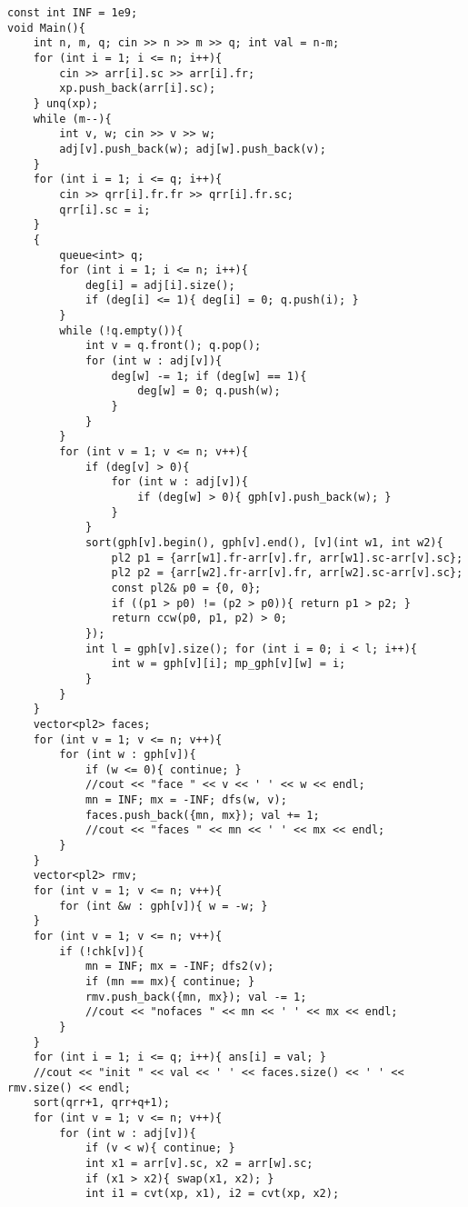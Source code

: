 \documentclass[landscape, 8pt, a4paper, oneside, twocolumn]{extarticle}
\begin{document}
\begin{verbatim}
const int INF = 1e9;
void Main(){
    int n, m, q; cin >> n >> m >> q; int val = n-m;
    for (int i = 1; i <= n; i++){
        cin >> arr[i].sc >> arr[i].fr;
        xp.push_back(arr[i].sc);
    } unq(xp);
    while (m--){
        int v, w; cin >> v >> w;
        adj[v].push_back(w); adj[w].push_back(v);
    }
    for (int i = 1; i <= q; i++){
        cin >> qrr[i].fr.fr >> qrr[i].fr.sc;
        qrr[i].sc = i;
    }
    {
        queue<int> q;
        for (int i = 1; i <= n; i++){
            deg[i] = adj[i].size();
            if (deg[i] <= 1){ deg[i] = 0; q.push(i); }
        }
        while (!q.empty()){
            int v = q.front(); q.pop();
            for (int w : adj[v]){
                deg[w] -= 1; if (deg[w] == 1){
                    deg[w] = 0; q.push(w);
                }
            }
        }
        for (int v = 1; v <= n; v++){
            if (deg[v] > 0){
                for (int w : adj[v]){
                    if (deg[w] > 0){ gph[v].push_back(w); }
                }
            }
            sort(gph[v].begin(), gph[v].end(), [v](int w1, int w2){
                pl2 p1 = {arr[w1].fr-arr[v].fr, arr[w1].sc-arr[v].sc};
                pl2 p2 = {arr[w2].fr-arr[v].fr, arr[w2].sc-arr[v].sc};
                const pl2& p0 = {0, 0};
                if ((p1 > p0) != (p2 > p0)){ return p1 > p2; }
                return ccw(p0, p1, p2) > 0;
            });
            int l = gph[v].size(); for (int i = 0; i < l; i++){
                int w = gph[v][i]; mp_gph[v][w] = i;
            }
        }
    }
    vector<pl2> faces;
    for (int v = 1; v <= n; v++){
        for (int w : gph[v]){
            if (w <= 0){ continue; }
            //cout << "face " << v << ' ' << w << endl;
            mn = INF; mx = -INF; dfs(w, v);
            faces.push_back({mn, mx}); val += 1;
            //cout << "faces " << mn << ' ' << mx << endl;
        }
    }
    vector<pl2> rmv;
    for (int v = 1; v <= n; v++){
        for (int &w : gph[v]){ w = -w; }
    }
    for (int v = 1; v <= n; v++){
        if (!chk[v]){
            mn = INF; mx = -INF; dfs2(v);
            if (mn == mx){ continue; }
            rmv.push_back({mn, mx}); val -= 1;
            //cout << "nofaces " << mn << ' ' << mx << endl;
        }
    }
    for (int i = 1; i <= q; i++){ ans[i] = val; }
    //cout << "init " << val << ' ' << faces.size() << ' ' << rmv.size() << endl;
    sort(qrr+1, qrr+q+1);
    for (int v = 1; v <= n; v++){
        for (int w : adj[v]){
            if (v < w){ continue; }
            int x1 = arr[v].sc, x2 = arr[w].sc;
            if (x1 > x2){ swap(x1, x2); }
            int i1 = cvt(xp, x1), i2 = cvt(xp, x2);

\end{verbatim}
\end{document}
